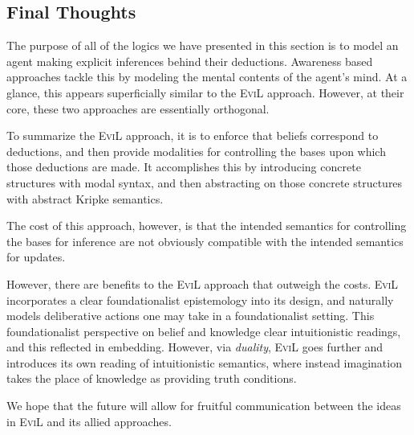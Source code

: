 \subsection{Final Thoughts}

The purpose of all of the logics we have presented in this section is
to model an agent making explicit inferences behind their deductions.
Awareness based approaches tackle this by modeling the mental
contents of the agent's mind.  At a glance, this appears superficially
similar to the \textsc{EviL} approach.  However, at their core, these
two approaches are essentially orthogonal.

To summarize the \textsc{EviL} approach, it is to enforce that beliefs
correspond to deductions, and then provide modalities for controlling 
the bases upon which those deductions are made.  It accomplishes this
by introducing concrete structures with modal syntax, and then
abstracting on those concrete structures with abstract Kripke
semantics.

The cost of this approach, however, is that the intended semantics
for controlling the bases for inference are not obviously compatible
with the intended semantics for updates.

However, there are benefits to the \textsc{EviL} approach that
outweigh the costs.  \textsc{EviL} incorporates a clear
foundationalist epistemology into its design, and naturally models 
deliberative actions one may take in a foundationalist setting. 
This foundationalist perspective on belief and knowledge clear intuitionistic readings, and
this reflected in embedding.  However, via \emph{duality},
\textsc{EviL} goes further and introduces its own reading of
intuitionistic semantics, where instead imagination takes the place of
knowledge as providing truth conditions.

We hope that the future will allow for fruitful communication
between the ideas in \textsc{EviL} and its allied approaches.



